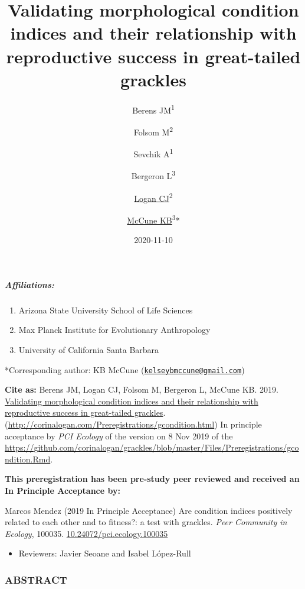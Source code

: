 \documentclass[
]{article}
\title{Validating morphological condition indices and their relationship with
reproductive success in great-tailed grackles}
\author{Berens JM\textsuperscript{1} \and Folsom M\textsuperscript{2} \and Sevchik A\textsuperscript{1} \and Bergeron L\textsuperscript{3} \and \href{http://CorinaLogan.com}{Logan CJ}\textsuperscript{2} \and \href{https://www.kelseymccune.com/}{McCune KB}\textsuperscript{3}*}
\date{2020-11-10}
\providecommand{\tightlist}{%
  \setlength{\itemsep}{0pt}\setlength{\parskip}{0pt}}
\begin{document}
\maketitle

\hypertarget{affiliations}{%
\subparagraph{Affiliations:}\label{affiliations}}

\begin{enumerate}
\def\labelenumi{\arabic{enumi})}
\tightlist
\item
  Arizona State University School of Life Sciences
\item
  Max Planck Institute for Evolutionary Anthropology
\item
  University of California Santa Barbara
\end{enumerate}

*Corresponding author: KB McCune
(\href{mailto:kelseybmccune@gmail.com}{\nolinkurl{kelseybmccune@gmail.com}})

\textbf{Cite as:} Berens JM, Logan CJ, Folsom M, Bergeron L, McCune KB.
2019.
\href{http://corinalogan.com/Preregistrations/gcondition.html}{Validating
morphological condition indices and their relationship with reproductive
success in great-tailed grackles}.
(\url{http://corinalogan.com/Preregistrations/gcondition.html}) In
principle acceptance by \emph{PCI Ecology} of the version on 8 Nov 2019
of the
\url{https://github.com/corinalogan/grackles/blob/master/Files/Preregistrations/gcondition.Rmd}.

\textbf{This preregistration has been pre-study peer reviewed and
received an In Principle Acceptance by:}

Marcos Mendez (2019 In Principle Acceptance) Are condition indices
positively related to each other and to fitness?: a test with grackles.
\emph{Peer Community in Ecology}, 100035.
\href{https://doi.org/10.24072/pci.ecology.100035}{10.24072/pci.ecology.100035}

\begin{itemize}
\tightlist
\item
  Reviewers: Javier Seoane and Isabel López-Rull
\end{itemize}

\hypertarget{abstract}{%
\subsubsection{ABSTRACT}\label{abstract}}
\end{document}
